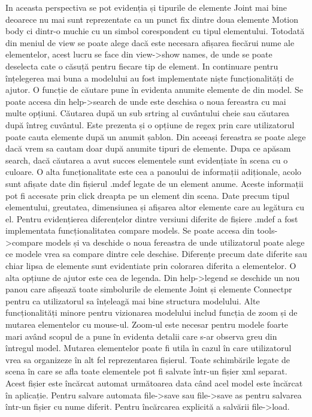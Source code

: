 In aceasta perspectiva se pot evidenția și tipurile de elemente Joint mai bine deoarece nu mai sunt reprezentate ca un punct 
fix dintre doua elemente Motion body ci dintr-o muchie cu un simbol corespondent cu tipul elementului. Totodată din meniul 
de view se poate alege dacă este necesara afișarea fiecărui nume ale elementelor, acest lucru se face din view->show names, 
de unde se poate deselecta cate o căsuță pentru fiecare tip de element. In continuare pentru înțelegerea mai buna a modelului 
au fost implementate niște funcționalități de ajutor. O funcție de căutare pune în evidenta anumite elemente de din model. 
Se poate accesa din help->search de unde este deschisa o noua fereastra cu mai multe opțiuni. Căutarea după un sub srtring 
al cuvântului cheie sau căutarea după întreg cuvântul. Este prezenta și o opțiune de regex prin care utilizatorul poate 
cauta elemente după un anumit șablon. Din aceeași fereastra se poate alege dacă vrem sa cautam doar după anumite tipuri 
de elemente. Dupa ce apăsam search, dacă căutarea a avut succes elementele sunt evidențiate în scena cu o culoare. O alta 
funcționalitate este cea a panoului de informații adiționale, acolo sunt afișate date din fișierul .mdef legate de un element 
anume. Aceste informații pot fi accesate prin click dreapta pe un element din scena. Date precum tipul elementului, greutatea, 
dimensiunea și afișarea altor elemente care au legătura cu el. Pentru evidențierea diferențelor dintre versiuni diferite de 
fișiere .mdef a fost implementata funcționalitatea compare models. Se poate accesa din tools->compare models și va deschide 
o noua fereastra de unde utilizatorul poate alege ce modele vrea sa compare dintre cele deschise. Diferențe precum date diferite 
sau chiar lipsa de elemente sunt evidentiate prin colorarea diferita a elementelor. O alta opțiune de ajutor este cea de legenda. 
Din help->legend se deschide un nou panou care afișează toate simbolurile de elemente Joint și elemente Connectpr pentru ca 
utilizatorul sa înțeleagă mai bine structura modelului. Alte funcționalități minore pentru vizionarea modelului includ funcția 
de zoom și de mutarea elementelor cu mouse-ul. Zoom-ul este necesar pentru modele foarte mari având scopul de a pune în evidenta 
detalii care s-ar observa greu din întregul model. Mutarea elementelor poate fi utila în cazul în care utilizatorul vrea sa 
organizeze în alt fel reprezentarea fișierul. Toate schimbările legate de scena în care se afla toate elementele pot fi salvate 
într-un fișier xml separat. Acest fișier este încărcat automat următoarea data când acel model este încărcat în aplicație. 
Pentru salvare automata file->save sau file->save as pentru salvarea într-un fișier cu nume diferit. Pentru încărcarea explicită 
a salvării file->load. 